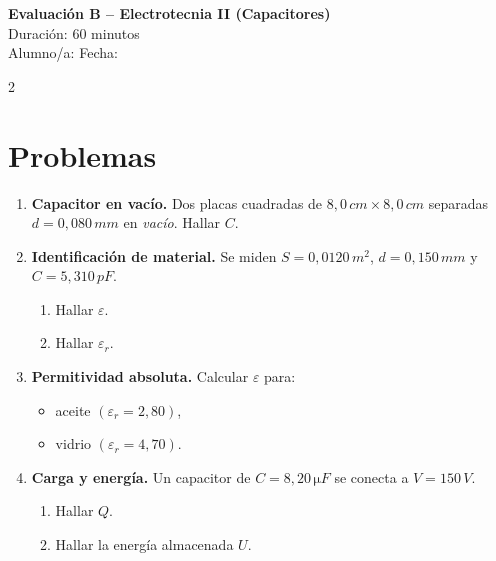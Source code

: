 \documentclass[a4paper,10pt]{article}
\begin{document}
\begin{center}
    \Large \textbf{Evaluación B – Electrotecnia II (Capacitores)} \\
    \normalsize Duración: 60 minutos \\
    Alumno/a: \underline{\hspace{6cm}} \hspace{0.5cm} Fecha: \underline{\hspace{2cm}}
\end{center}

\vspace{0.3cm}

\begin{multicols}{2}

\section*{Problemas}

\begin{enumerate}
\item \textbf{Capacitor en vacío.} Dos placas cuadradas de \(8,0\,\si{cm} \times 8,0\,\si{cm}\) separadas \(d=0,080\,\si{mm}\) en \textit{vacío}. Hallar \(C\).

\item \textbf{Identificación de material.} Se miden \(S=0,0120\,\si{m^2}\), \(d=0,150\,\si{mm}\) y \(C=5,310\,\si{pF}\).
\begin{enumerate}
\item Hallar \(\varepsilon\).
\item Hallar \(\varepsilon_r\).
\end{enumerate}

\item \textbf{Permitividad absoluta.} Calcular \(\varepsilon\) para:
\begin{itemize}
\item aceite \(\left(\varepsilon_r=2,80\right)\),
\item vidrio \(\left(\varepsilon_r=4,70\right)\).
\end{itemize}

\item \textbf{Carga y energía.} Un capacitor de \(C=8,20\,\si{\micro F}\) se conecta a \(V=150\,\si{V}\).
\begin{enumerate}
\item Hallar \(Q\).
\item Hallar la energía almacenada \(U\).
\end{enumerate}


\end{enumerate}
\end{multicols}
\end{document}
